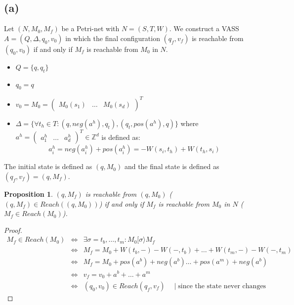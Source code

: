 \documentclass[a4paper,12pt]{article}
\newcommand{\Z}{\ensuremath{\mathbb{Z}}}
\newcounter{sheet}
\newtheorem{proposition}{Proposition}[sheet]
\newcommand{\myvec}[1]{\ensuremath{\begin{pmatrix}#1\end{pmatrix}}}
\begin{document}
\subsection*{(a)}
Let $(N,M_0,M_f)$ be a Petri-net with $N = (S,T,W)$. We construct a VASS $A=(Q,\Delta,q_0,v_0)$ in which the final configuration $(q_f,v_f)$ is reachable from $(q_0,v_0)$ if and only if $M_f$ is reachable from $M_0$ in $N$.
\begin{itemize}
\item $Q = \{q,q_t\}$
\item $q_0 = q$
\item $v_0 = M_0 = \myvec{M_0 (s_1)& \dots & M_0(s_d)}^T$
\item $\Delta = \{\forall t_h \in T: (q,neg(a^h),q_t), (q_t,pos(a^h),q)\}$ where $a^h = \myvec{a_1^h& \dots &a_d^h}^T \in \Z^d$ is defined as:
\[a_i^h = neg(a_i^h) + pos(a_i^h) = -W(s_i,t_h) + W(t_h,s_i)\]
\end{itemize}
The initial state is defined as $(q,M_0)$ and the final state is defined as $(q_f,v_f) = (q,M_f)$.

\begin{proposition}
$(q,M_f)$ is reachable from $(q,M_0)$ ($(q,M_f) \in Reach((q,M_0))$) if and only if $M_f$ is reachable from $M_0$ in $N$ ($M_f \in Reach(M_0)$).
\end{proposition}

\begin{proof}
\begin{eqnarray*}
M_f \in Reach(M_0) &\Leftrightarrow & \exists \sigma = t_b,\dots ,t_m: M_0 [\sigma \rangle M_f \\
&\Leftrightarrow & M_f = M_0 + W(t_b,-) - W(-,t_b) + \dots + W(t_m,-) - W(-,t_m) \\
&\Leftrightarrow & M_f = M_0 + pos(a^b) + neg(a^b) \dots + pos(a^m) + neg(a^b) \\
&\Leftrightarrow & v_f = v_0 + a^b + \dots + a^m \\
&\Leftrightarrow & (q_0,v_0) \in Reach(q_f,v_f) \quad \mid \text{since the state never changes} 
\end{eqnarray*}
\end{proof}
\end{document}
